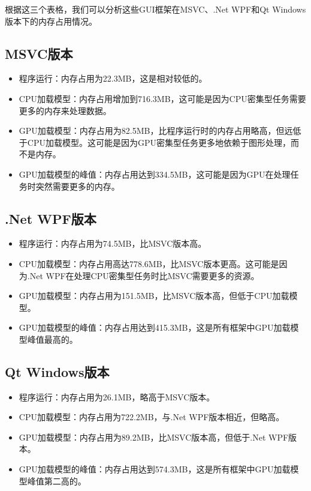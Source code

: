 根据这三个表格，我们可以分析这些GUI框架在MSVC、.Net WPF和Qt Windows版本下的内存占用情况。

\subsection{MSVC版本}

\begin{itemize}
	\item 程序运行：内存占用为22.3MB，这是相对较低的。
	\item CPU加载模型：内存占用增加到716.3MB，这可能是因为CPU密集型任务需要更多的内存来处理数据。
	\item GPU加载模型：内存占用为82.5MB，比程序运行时的内存占用略高，但远低于CPU加载模型。这可能是因为GPU密集型任务更多地依赖于图形处理，而不是内存。
	\item GPU加载模型的峰值：内存占用达到334.5MB，这可能是因为GPU在处理任务时突然需要更多的内存。
\end{itemize}

\subsection{.Net WPF版本}

\begin{itemize}
	\item 程序运行：内存占用为74.5MB，比MSVC版本高。
	\item CPU加载模型：内存占用高达778.6MB，比MSVC版本更高。这可能是因为.Net WPF在处理CPU密集型任务时比MSVC需要更多的资源。
	\item GPU加载模型：内存占用为151.5MB，比MSVC版本高，但低于CPU加载模型。
	\item GPU加载模型的峰值：内存占用达到415.3MB，这是所有框架中GPU加载模型峰值最高的。
\end{itemize}

\subsection{Qt Windows版本}

\begin{itemize}
	\item 程序运行：内存占用为26.1MB，略高于MSVC版本。
	\item CPU加载模型：内存占用为722.2MB，与.Net WPF版本相近，但略高。
	\item GPU加载模型：内存占用为89.2MB，比MSVC版本高，但低于.Net WPF版本。
	\item GPU加载模型的峰值：内存占用达到574.3MB，这是所有框架中GPU加载模型峰值第二高的。
\end{itemize}


